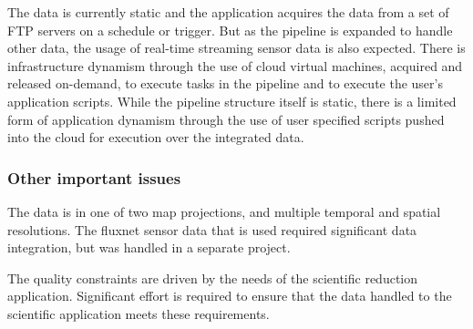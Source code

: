 
 The data is currently static and the application acquires the data
 from a set of FTP servers on a schedule or trigger. But as the
 pipeline is expanded to handle other data, the usage of real-time
 streaming sensor data is also expected. There is infrastructure
 dynamism through the use of cloud virtual machines, acquired and
 released on-demand, to execute tasks in the pipeline and to execute
 the user's application scripts. While the pipeline structure itself
 is static, there is a limited form of application dynamism through
 the use of user specified scripts pushed into the cloud for execution
 over the integrated data.


 \subsubsection*{Other important issues}



The data is in one of two map projections, and multiple temporal and spatial resolutions. The
fluxnet sensor data that is used required significant data integration, but was handled in a
separate project.

The quality constraints are driven by the needs of the scientific reduction application. Significant
effort is required to ensure that the data handled to the scientific application meets these
requirements.






